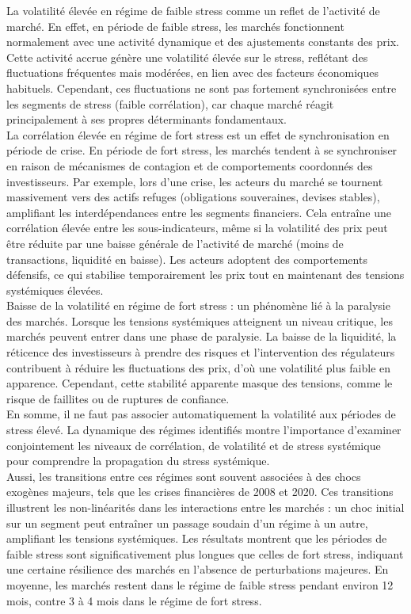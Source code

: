 La volatilité élevée en régime de faible stress comme un reflet de l’activité de marché. En effet, en période de faible stress, les marchés fonctionnent normalement avec une activité dynamique et des ajustements constants des prix. Cette activité accrue génère une volatilité élevée sur le stress, reflétant des fluctuations fréquentes mais modérées, en lien avec des facteurs économiques habituels. Cependant, ces fluctuations ne sont pas fortement synchronisées entre les segments de stress (faible corrélation), car chaque marché réagit principalement à ses propres déterminants fondamentaux.\\

La corrélation élevée en régime de fort stress est un effet de synchronisation en période de crise. En période de fort stress, les marchés tendent à se synchroniser en raison de mécanismes de contagion et de comportements coordonnés des investisseurs. Par exemple, lors d’une crise, les acteurs du marché se tournent massivement vers des actifs refuges (obligations souveraines, devises stables), amplifiant les interdépendances entre les segments financiers. Cela entraîne une corrélation élevée entre les sous-indicateurs, même si la volatilité des prix peut être réduite par une baisse générale de l’activité de marché (moins de transactions, liquidité en baisse). Les acteurs adoptent des comportements défensifs, ce qui stabilise temporairement les prix tout en maintenant des tensions systémiques élevées.\\

Baisse de la volatilité en régime de fort stress : un phénomène lié à la paralysie des marchés. Lorsque les tensions systémiques atteignent un niveau critique, les marchés peuvent entrer dans une phase de paralysie. La baisse de la liquidité, la réticence des investisseurs à prendre des risques et l’intervention des régulateurs contribuent à réduire les fluctuations des prix, d’où une volatilité plus faible en apparence. Cependant, cette stabilité apparente masque des tensions, comme le risque de faillites ou de ruptures de confiance.\\

En somme, il ne faut pas associer automatiquement la volatilité aux périodes de stress élevé. La dynamique des régimes identifiés montre l’importance d’examiner conjointement les niveaux de corrélation, de volatilité et de stress systémique pour comprendre la propagation du stress systémique.\\

Aussi, les transitions entre ces régimes sont souvent associées à des chocs exogènes majeurs, tels que les crises financières de 2008 et 2020. Ces transitions illustrent les non-linéarités dans les interactions entre les marchés : un choc initial sur un segment peut entraîner un passage soudain d’un régime à un autre, amplifiant les tensions systémiques. Les résultats montrent que les périodes de faible stress sont significativement plus longues que celles de fort stress, indiquant une certaine résilience des marchés en l’absence de perturbations majeures. En moyenne, les marchés restent dans le régime de faible stress pendant environ 12 mois, contre 3 à 4 mois dans le régime de fort stress.\\

